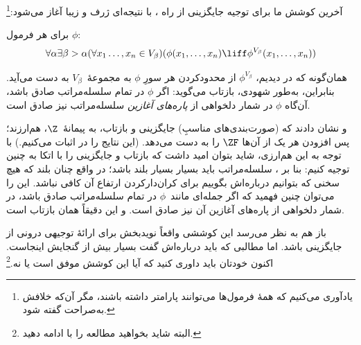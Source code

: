 \documentclass[../../../include/open-logic-section]{subfiles}
\begin{document}

آخرین کوشش ما برای توجیه جایگزینی از راه \stagesinex، با نتیجه‌ای ژرف و زیبا آغاز می‌شود:\footnote{یادآوری می‌کنیم که همهٔ فرمول‌ها می‌توانند پارامتر داشته باشند، مگر آن‌که خلافش به‌صراحت گفته شود.}
\begin{thm}
برای هر فرمول $\phi$:
\[
\forall \alpha \exists \beta > \alpha (\forall x_1 \ldots, x_n \in
V_\beta)(\phi(x_1, \ldots, x_n) \liff \phi^{V_\beta}(x_1, \ldots, x_n))
\]
\end{thm}
\noindent
همان‌گونه که در  دیدیم، $\phi^{V_\beta}$ از محدودکردن هر سورِ
$\phi$ به مجموعهٔ~$V_\beta$ به دست می‌آید. بنابراین، به‌طور شهودی،
بازتاب می‌گوید: اگر $\phi$ در تمام سلسله‌مراتب صادق باشد، آن‌گاه
$\phi$ در شمار دلخواهی از \emph{پاره‌های آغازین} سلسله‌مراتب نیز
صادق است.

\citet{Montague1961} و \citet{Levy1960} نشان دادند که (صورت‌بندی‌های
مناسبِ) جایگزینی و بازتاب، به پیمانهٔ~$\Z$، هم‌ارزند؛ پس افزودن هر
یک از آن‌ها $\ZF$ را به دست می‌دهد. (این نتایج را در
 اثبات می‌کنیم.) با توجه به
این هم‌ارزی، شاید بتوان امید داشت که بازتاب و جایگزینی را با اتکا به
\stagesinex{} چنین توجیه کنیم: بنا بر \stagesinex، سلسله‌مراتب باید
بسیار بسیار بلند باشد؛ در واقع چنان بلند که هیچ سخنی که بتوانیم
درباره‌اش بگوییم برای کران‌دارکردن ارتفاع آن کافی نباشد. این را
می‌توان چنین فهمید که اگر جمله‌ای مانند~$\phi$ در تمام سلسله‌مراتب
صادق باشد، در شمار دلخواهی از پاره‌های آغازین آن نیز صادق است.
و این دقیقاً همان بازتاب است.

باز هم به نظر می‌رسد این کوششی واقعاً نویدبخش برای ارائهٔ توجیهی
درونی از جایگزینی باشد. اما مطالبی که باید درباره‌اش گفت بسیار بیش
از گنجایش اینجاست. اکنون خودتان باید داوری کنید که آیا این کوشش
موفق است یا نه.\footnote{البته شاید بخواهید مطالعه را با
\citet[95--100]{Incurvati2020} ادامه دهید.}
\end{document}

